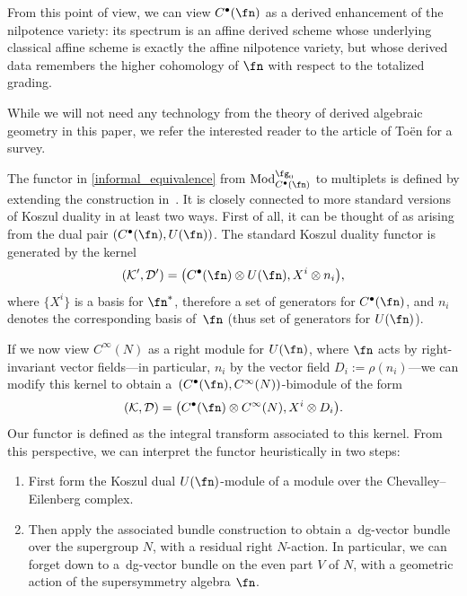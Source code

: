 \documentclass[10pt,a4paper]{amsart}
\numberwithin{equation}{section}
\begin{document}
From this point of view, we can view $C^\bullet(\fn)$ as a derived enhancement of the nilpotence variety: its spectrum is an affine derived scheme whose underlying classical affine scheme is exactly the affine nilpotence variety, but whose derived data remembers the higher cohomology of $\fn$ with respect to the totalized grading.

\begin{rmk}
	While we will not need any technology from the theory of derived algebraic geometry in this paper, we refer the interested reader to the article \cite{ToenDAG} of To\"en for a survey.
\end{rmk}

The functor in \eqref{informal_equivalence} from $\mathrm{Mod}_{C^\bullet(\fn)}^{\fg_0}$ to multiplets is defined by extending the construction in~\cite{perspectives}. It is closely connected to more standard versions of Koszul duality in at least two ways.
First of all, it can be thought of as arising from the dual pair $(C^\bullet(\fn), U(\fn))$. The standard Koszul duality functor is generated by the kernel
\begin{equation*}
(\mathcal K', \mathcal D') = \big(C^\bullet(\fn) \otimes U(\fn) , X^i \otimes n_i\big),
\end{equation*}
where $\big\{X^i\big\}$ is a basis for $\fn^*$, therefore a set of generators for $C^\bullet(\fn)$, and $n_i$ denotes the corresponding
basis of~$\fn$ (thus set of generators for $U(\fn)$).

If we now view $C^\infty(N)$ as a right module for $U(\fn)$, where $\fn$ acts by right-invariant vector fields---in particular, $n_i$ by the vector field $D_i := \rho(n_i)$---we can modify this kernel to obtain a~$(C^\bullet(\fn), C^\infty(N))$-bimodule of the form
\begin{equation*}
(\mathcal K, \mathcal D) = \big(C^\bullet(\fn) \otimes C^\infty(N) , X^i \otimes D_i\big).
\end{equation*}
Our functor is defined as the integral transform associated to this kernel. From this perspective, we can interpret the functor heuristically in two steps:
\begin{enumerate}\itemsep=0pt
	\item First form the Koszul dual $U(\fn)$-module of a module over the Chevalley--Eilenberg complex.
	\item Then apply the associated bundle construction to obtain a~dg-vector bundle over the supergroup $N$, with a residual right $N$-action. In particular, we can forget down to a~dg-vector bundle on the even part $V$ of $N$, with a geometric action of the supersymmetry algebra $\fn$.
\end{enumerate}
\end{document}
